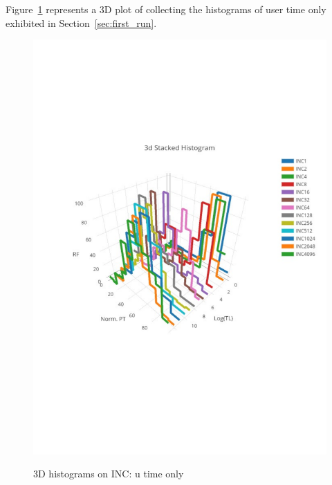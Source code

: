 \pagebreak
\clearpage
Figure~\ref{fig:hist3d_u} represents a 3D plot of collecting the histograms of user time only
exhibited in Section~\ref{sec:first_run}. 
\begin{figure}[htp!]
	\centering
	\includegraphics[scale=1]{u_s_time/3dplot_utime_only}\label{fig:3d_plot_u}
	\caption{3D histograms on INC: u time only~\label{fig:hist3d_u}}
\end{figure}

\clearpage
\pagebreak

